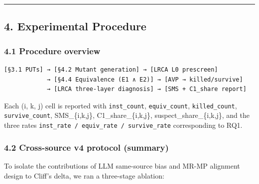 \documentclass[review,12pt,authoryear]{elsarticle}
\begin{document}
\begin{center}\rule{0.5\linewidth}{0.5pt}\end{center}

\subsection{4. Experimental Procedure}\label{experimental-procedure}

\subsubsection{4.1 Procedure overview}\label{procedure-overview}

\begin{verbatim}
[§3.1 PUTs] → [§4.2 Mutant generation] → [LRCA L0 prescreen]
            → [§4.4 Equivalence (E1 ∧ E2)] → [AVP → killed/survive]
            → [LRCA three-layer diagnosis] → [SMS + C1_share report]
\end{verbatim}

Each (i, k, j) cell is reported with \texttt{inst\_count},
\texttt{equiv\_count}, \texttt{killed\_count}, \texttt{survive\_count},
SMS\_\{i,k,j\}, C1\_share\_\{i,k,j\}, suspect\_share\_\{i,k,j\}, and the
three rates \texttt{inst\_rate\ /\ equiv\_rate\ /\ survive\_rate}
corresponding to RQ1.

\subsubsection{4.2 Cross-source v4 protocol
(summary)}\label{cross-source-v4-protocol-summary}

To isolate the contributions of LLM same-source bias and MR-MP alignment
design to Cliff's delta, we ran a three-stage ablation:
\end{document}

